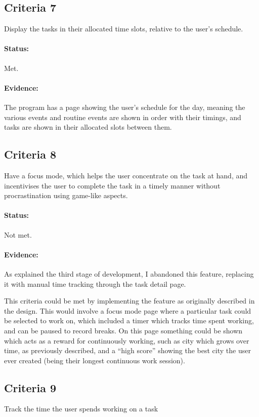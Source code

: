 \documentclass{article}
\begin{document}
\subsection{Criteria 7}
Display the tasks in their allocated time slots,
relative to the user's schedule.

\paragraph{Status:}
Met.

\paragraph{Evidence:}
The program has a page showing the user's schedule for the day,
meaning the various events and routine events are shown in order with their timings,
and tasks are shown in their allocated slots between them.

\subsection{Criteria 8}
Have a focus mode, which helps the user concentrate on the task at hand,
and incentivises the user to complete the task in a timely manner without
procrastination using game-like aspects.

\paragraph{Status:}
Not met.

\paragraph{Evidence:}
As explained the third stage of development,
I abandoned this feature,
replacing it with manual time tracking through the task detail page.

This criteria could be met by implementing the feature as originally described in the design.
This would involve a focus mode page where a particular task could be selected to work on,
which included a timer which tracks time spent working,
and can be paused to record breaks.
On this page something could be shown which acts as a reward for continuously working,
such as city which grows over time,
as previously described,
and a ``high score'' showing the best city the user ever created
(being their longest continuous work session).

\subsection{Criteria 9}
Track the time the user spends working on a task
\end{document}
